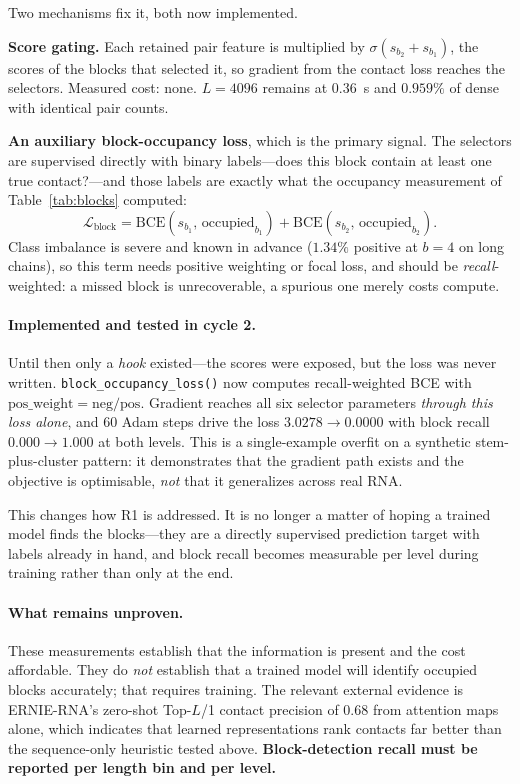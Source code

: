 \documentclass[11pt,a4paper]{article}
\begin{document}
Two mechanisms fix it, both now implemented.

\textbf{Score gating.} Each retained pair feature is multiplied by
$\sigma(s_{b_2} + s_{b_1})$, the scores of the blocks that selected it, so
gradient from the contact loss reaches the selectors. Measured cost: none.
$L=4096$ remains at $0.36$~s and $0.959\%$ of dense with identical pair counts.

\textbf{An auxiliary block-occupancy loss}, which is the primary signal. The
selectors are supervised directly with binary labels---does this block contain at
least one true contact?---and those labels are exactly what the occupancy
measurement of Table~\ref{tab:blocks} computed:
\begin{equation}
\mathcal{L}_{\text{block}} = \mathrm{BCE}(s_{b_1},\, \text{occupied}_{b_1}) + \mathrm{BCE}(s_{b_2},\, \text{occupied}_{b_2}).
\end{equation}
Class imbalance is severe and known in advance ($1.34\%$ positive at $b=4$ on
long chains), so this term needs positive weighting or focal loss, and should be
\emph{recall}-weighted: a missed block is unrecoverable, a spurious one merely
costs compute.

\paragraph{Implemented and tested in cycle 2.} Until then only a \emph{hook}
existed---the scores were exposed, but the loss was never written.
\texttt{block\_occupancy\_loss()} now computes recall-weighted BCE with
$\text{pos\_weight} = \text{neg}/\text{pos}$. Gradient reaches all six selector
parameters \emph{through this loss alone}, and 60 Adam steps drive the loss
$3.0278 \rightarrow 0.0000$ with block recall $\mathbf{0.000 \rightarrow 1.000}$
at both levels. This is a single-example overfit on a synthetic
stem-plus-cluster pattern: it demonstrates that the gradient path exists and the
objective is optimisable, \emph{not} that it generalizes across real RNA.

This changes how R1 is addressed. It is no longer a matter of hoping a trained
model finds the blocks---they are a directly supervised prediction target with
labels already in hand, and block recall becomes measurable per level during
training rather than only at the end.

\paragraph{What remains unproven.} These measurements establish that the
information is present and the cost affordable. They do \emph{not} establish
that a trained model will identify occupied blocks accurately; that requires
training. The relevant external evidence is ERNIE-RNA's zero-shot Top-$L$/1
contact precision of $0.68$ from attention maps alone, which indicates that
learned representations rank contacts far better than the sequence-only
heuristic tested above. \textcolor{risk}{\textbf{Block-detection recall must be
reported per length bin and per level.}}
\end{document}
